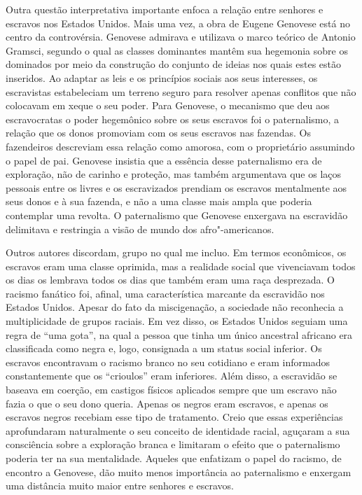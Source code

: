Outra questão interpretativa importante enfoca a relação entre senhores
e escravos nos Estados Unidos. Mais uma vez, a obra de Eugene Genovese
está no centro da controvérsia. Genovese admirava e utilizava o marco
teórico de Antonio Gramsci, segundo o qual as classes dominantes mantêm
sua hegemonia sobre os dominados por meio da construção do conjunto de
ideias nos quais estes estão inseridos. Ao adaptar as leis e os
princípios sociais aos seus interesses, os escravistas estabeleciam um
terreno seguro para resolver apenas conflitos que não colocavam em xeque
o seu poder. Para Genovese, o mecanismo que deu aos escravocratas o
poder hegemônico sobre os seus escravos foi o paternalismo, a relação
que os donos promoviam com os seus escravos nas fazendas. Os fazendeiros
descreviam essa relação como amorosa, com o proprietário assumindo o
papel de pai. Genovese insistia que a essência desse paternalismo era de
exploração, não de carinho e proteção, mas também argumentava que os
laços pessoais entre os livres e os escravizados prendiam os escravos
mentalmente aos seus donos e à sua fazenda, e não a uma classe mais
ampla que poderia contemplar uma revolta. O paternalismo que Genovese
enxergava na escravidão delimitava e restringia a visão de mundo dos
afro"-americanos.

Outros autores discordam, grupo no qual me incluo. Em termos econômicos,
os escravos eram uma classe oprimida, mas a realidade social que
vivenciavam todos os dias os lembrava todos os dias que também eram uma
raça desprezada. O racismo fanático foi, afinal, uma característica
marcante da escravidão nos Estados Unidos. Apesar do fato da
miscigenação, a sociedade não reconhecia a multiplicidade de grupos
raciais. Em vez disso, os Estados Unidos seguiam uma regra de ``uma
gota'', na qual a pessoa que tinha um único ancestral africano era
classificada como negra e, logo, consignada a um status social inferior.
Os escravos encontravam o racismo branco no seu cotidiano e eram
informados constantemente que os ``crioulos'' eram inferiores. Além
disso, a escravidão se baseava em coerção, em castigos físicos aplicados
sempre que um escravo não fazia o que o seu dono queria. Apenas os
negros eram escravos, e apenas os escravos negros recebiam esse tipo de
tratamento. Creio que essas experiências aprofundaram naturalmente o seu
conceito de identidade racial, aguçaram a sua consciência sobre a
exploração branca e limitaram o efeito que o paternalismo poderia ter na
sua mentalidade. Aqueles que enfatizam o papel do racismo, de encontro a
Genovese, dão muito menos importância ao paternalismo e enxergam uma
distância muito maior entre senhores e escravos.

